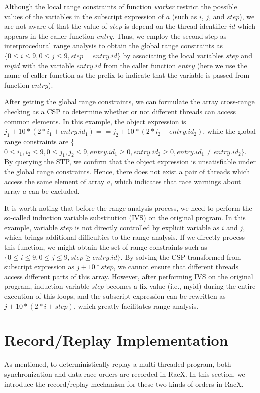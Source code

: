 \documentclass[10pt,onecolumn,letterpaper]{article}
\begin{document}
Although the local range constraints of function \emph{worker}
restrict the possible values of the variables in the subscript
expression of $a$ (such as $i$, $j$, and $step$), we are not aware
of that the value of $step$ is depend on the thread identifier $id$
which appears in the caller function \emph{entry}. Thus, we employ
the second step as interprocedural range analysis to obtain the
global range constraints as $\{0 \le i \le 9,0 \le j \le 9,
step=entry.id\}$ by associating the local variables $step$ and
$myid$ with the variable $entry.id$ from  the caller function
$entry$ (here we use the name of caller function as the prefix to
indicate that the variable is passed from function $entry$).

After getting the global range constraints, we can formulate the
array cross-range checking as a CSP to determine whether or not
different threads can access common elements. In this example, the
object expression is $j_1+10*(2*i_1+entry.id_1)==
j_2+10*(2*i_2+entry.id_2)$, while the global range constraints are
\{$0 \le i_1,i_2 \le 9,0 \le j_1,j_2 \le 9, entry.id_1 \ge
0,entry.id_2 \ge 0, entry.id_1\neq entry.id_2$\}. By querying the
STP, we confirm that the object expression is unsatisfiable under
the global range constraints. Hence, there does not exist a pair of
threads which access the same element of array $a$, which indicates
that race warnings about array $a$ can be excluded.

It is worth noting that before the range analysis process, we need
to perform the so-called induction variable substitution (IVS) on
the original program. In this example, variable $step$ is not
directly controlled by explicit variable as $i$ and $j$, which
brings additional difficulties to the range analysis. If we directly
process this function, we might obtain the set of range constraints
such as $\{0 \le i \le 9,0 \le j \le 9, step \ge entry.id\}$. By
solving the CSP transformed from subscript expression as $j + 10 *
step$, we cannot ensure that different threads access different
parts of this array. However, after performing IVS on the original
program, induction variable \emph{step} becomes a fix value (i.e.,
myid) during the entire execution of this loops, and the subscript
expression can be rewritten as $j+10*(2*i+step)$, which greatly
facilitates range analysis.




\section{Record/Replay Implementation}
As mentioned, to deterministically replay a multi-threaded program,
both synchronization and data race orders are recorded in RacX. In
this section, we introduce the record/replay mechanism for these two
kinds of orders in RacX.
\end{document}
